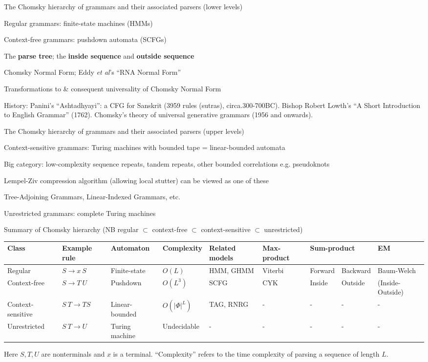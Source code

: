 \documentclass{beamer}
\begin{document}
\begin{frame}{}
\itemb
\item The Chomsky hierarchy of grammars and their associated parsers (lower levels)
 \itemb
 \item Regular grammars: finite-state machines (HMMs)
 \item Context-free grammars: pushdown automata (SCFGs)
  \itemb
  \item The {\bf parse tree}; the {\bf inside sequence} and {\bf outside sequence}
  \item Chomsky Normal Form; Eddy {\em et al}'s ``RNA Normal Form''
  \item Transformations to \& consequent universality of Chomsky Normal Form
  \item History:
Panini's ``Ashtadhyayi'': a CFG for Sanskrit (3959 rules (sutras), circa.300-700BC).
Bishop Robert Lowth's ``A Short Introduction to English Grammar'' (1762).
Chomsky's theory of universal generative grammars (1956 and onwards).
  \iteme
 \iteme
\iteme
\end{frame}
\begin{frame}{}
\itemb
\item The Chomsky hierarchy of grammars and their associated parsers (upper levels)
 \itemb
 \item Context-sensitive grammars: Turing machines with bounded tape = linear-bounded automata
  \itemb
  \item Big category: low-complexity sequence repeats, tandem repeats, other bounded correlations e.g. pseudoknots
  \item Lempel-Ziv compression algorithm (allowing local stutter) can be viewed as one of these
  \item Tree-Adjoining Grammars, Linear-Indexed Grammars, etc.
  \iteme
 \item Unrestricted grammars: complete Turing machines
 \iteme
\iteme
\end{frame}
\begin{frame}{}
\itemb
\item Summary of Chomsky hierarchy (NB regular $\subset$ context-free $\subset$ context-sensitive $\subset$ unrestricted)
\\
\small
\begin{tabular}{lllllllll}
Class & Example rule & Automaton & Complexity & Related models & Max-product & \multicolumn{2}{l}{Sum-product} & EM \\
\hline
Regular & $S \to x\ S$ & Finite-state & $O(L)$ & HMM, GHMM & Viterbi & Forward & Backward & Baum-Welch \\
Context-free & $S \to T\ U$ & Pushdown & $O(L^3)$ & SCFG & CYK & Inside & Outside & (Inside-Outside) \\
Context-sensitive & $S\ T \to T S$ & Linear-bounded & $O(|\Phi|^L)$ & TAG, RNRG & - & - & - & - \\
Unrestricted & $S\ T \to U$ & Turing machine & Undecidable & - & - & - & - & -
\end{tabular}
\normalsize
Here $S,T,U$ are nonterminals and $x$ is a terminal.
``Complexity'' refers to the time complexity of parsing a sequence of length $L$.
\iteme

\end{frame}
\end{document}
